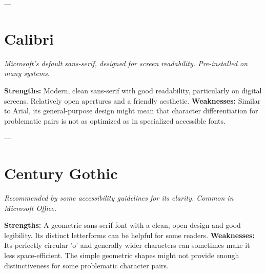 ---
\pagebreak
\section{Calibri}
\emph{Microsoft’s default sans-serif, designed for screen readability. Pre-installed on many systems.}
\begin{raggedright}
\textbf{Strengths:} Modern, clean sans-serif with good readability, particularly on digital screens. Relatively open apertures and a friendly aesthetic.
\textbf{Weaknesses:} Similar to Arial, its general-purpose design might mean that character differentiation for problematic pairs is not as optimized as in specialized accessible fonts.

\FontSample{\calibrifont}
\end{raggedright}

---
\pagebreak
\section{Century Gothic}
\emph{Recommended by some accessibility guidelines for its clarity. Common in Microsoft Office.}
\begin{raggedright}
\textbf{Strengths:} A geometric sans-serif font with a clean, open design and good legibility. Its distinct letterforms can be helpful for some readers.
\textbf{Weaknesses:} Its perfectly circular 'o' and generally wider characters can sometimes make it less space-efficient. The simple geometric shapes might not provide enough distinctiveness for some problematic character pairs.

\FontSample{\centurygothicfont}
\end{raggedright}
